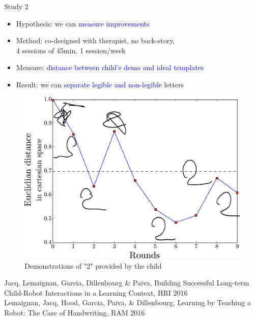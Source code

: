 \documentclass[compress]{beamer}
\renewcommand{\bf}{\Medium}
\begin{document}

\begin{frame}{Study 2}
    \begin{itemize}
    \item {\bf Hypothesis}: we can \textcolor{blue}{measure improvements}
    \item {\bf Method}: co-designed with therapist, no back-story, \\4 sessions of 45min, 1 session/week
    \item {\bf Measure}: \textcolor{blue}{distance between child's demo and ideal templates}
    \item {\bf Result}: we can \textcolor{blue}{separate legible and non-legible} letters
    \end{itemize}
    \begin{figure}
    	\includegraphics[width=0.4\columnwidth]{henry2}
    	\caption{Demonstrations of "2" provided by the child}
    \end{figure}
\tiny{Jacq, Lemaignan, Garcia, Dillenbourg \& Paiva, {\bf Building Successful Long-term Child-Robot Interactions in a Learning Context}, HRI 2016}\\
\tiny{Lemaignan, Jacq, Hood, Garcia, Paiva, \& Dillenbourg, {\bf Learning by Teaching a Robot: The Case of Handwriting}, RAM 2016}    

\end{frame}

\end{document}

